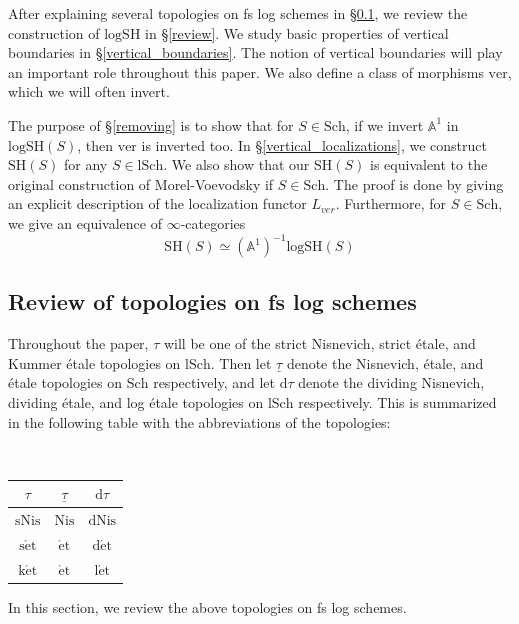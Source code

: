 \documentclass[10pt]{amsart}
\theoremstyle{definition}
\theoremstyle{remark}
\numberwithin{equation}{subsection}
\newcommand{\A}{\mathbb{A}}
\newcommand{\et}{\mathrm{\acute{e}t}}
\newcommand{\ul}{\underline}
\newcommand{\SH}{\mathrm{SH}}
\newcommand{\logSH}{\mathrm{logSH}}
\newcommand{\Sch}{\mathrm{Sch}}
\newcommand{\lSch}{\mathrm{lSch}}
\newcommand{\ver}{\mathrm{ver}}
\newcommand{\dtau}{\mathrm{d}\tau}
\newcommand{\sNis}{\mathrm{sNis}}
\newcommand{\dNis}{\mathrm{dNis}}
\newcommand{\ketale}{\mathrm{k\acute{e}t}}
\newcommand{\detale}{\mathrm{d\acute{e}t}}
\newcommand{\setale}{\mathrm{s\acute{e}t}}
\newcommand{\Nis}{\mathrm{Nis}}
\newcommand{\letale}{\mathrm{l\acute{e}t}}
\begin{document}
After explaining several topologies on fs log schemes in \S \ref{topology}, we review the construction of $\logSH$ in \S \ref{review}.
We study basic properties of vertical boundaries in \S \ref{vertical_boundaries}.
The notion of vertical boundaries will play an important role throughout this paper.
We also define a class of morphisms $\ver$, which we will often invert.

The purpose of \S \ref{removing} is to show that for $S\in \Sch$, if we invert $\A^1$ in $\logSH(S)$, then $\ver$ is inverted too.
In \S \ref{vertical_localizations}, we construct $\SH(S)$ for any $S\in \lSch$.
We also show that our $\SH(S)$ is equivalent to the original construction of Morel-Voevodsky if $S\in \Sch$.
The proof is done by giving an explicit description of the localization functor $L_{ver}$.
Furthermore, for $S\in \Sch$, we give an equivalence of $\infty$-categories
\[
\SH(S)
\simeq
(\A^1)^{-1}\logSH(S)
\]













\subsection{Review of topologies on fs log schemes}
\label{topology}

Throughout the paper,
$\tau$ will be one of the strict Nisnevich,
strict \'etale,
and Kummer \'etale topologies on $\lSch$.
Then let $\ul{\tau}$ denote the Nisnevich, \'etale, and \'etale topologies on $\Sch$ respectively,
and let $\dtau$ denote the dividing Nisnevich, dividing \'etale, and log \'etale topologies on $\lSch$ respectively.
This is summarized in the following table with the abbreviations of the topologies:

\

\begin{center}
\begin{tabular}{|c|c|c|}
\hline
$\tau$ & $\ul{\tau}$ & $\dtau$
\\
\hline
$\sNis$ & $\Nis$ & $\dNis$
\\
$\setale$ & $\et$ & $\detale$
\\
$\ketale$ & $\et$ & $\letale$
\\
\hline
\end{tabular}
\end{center}
In this section,
we review the above topologies on fs log schemes.
\end{document}

